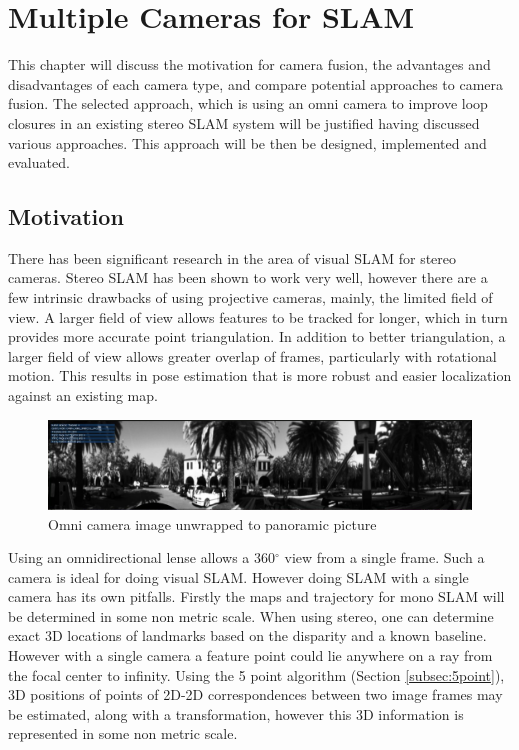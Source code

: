 \chapter{Multiple Cameras for SLAM}
\label{chapter:MultiCamSLAM}

This chapter will discuss the motivation for camera fusion, the advantages and disadvantages of each camera type, and compare potential approaches to camera fusion. The selected approach, which is using an omni camera to improve loop closures in an existing stereo SLAM system will be justified having discussed various approaches. This approach will be then be designed, implemented and evaluated.

\section{Motivation}

There has been significant research in the area of visual SLAM for stereo \\ cameras\cite{mei_09}\cite{paz_08}\cite{rslam}\cite{particle_slam}\cite{strasdat_11}.  Stereo SLAM has been shown to work very well, however there are a few intrinsic drawbacks of using projective cameras, mainly, the limited field of view.  A larger field of view allows features to be tracked for longer, which in turn provides more accurate point triangulation.  In addition to better triangulation, a larger field of view allows greater overlap of frames, particularly with rotational motion.  This results in pose estimation that is more robust and easier localization against an existing map. %

\begin{figure}[h!]
  \centering
    \includegraphics[width=1.0\textwidth]{chapters/images/unwrapped}
    \caption{Omni camera image unwrapped to panoramic picture}
  \label{fig:unwrapped}
\end{figure}

Using an omnidirectional lense allows a 360$^{\circ}$ view from a single frame.  Such a camera is ideal for doing visual SLAM.  However doing SLAM with a single camera has its own pitfalls.  Firstly the maps and trajectory for mono SLAM will be determined in some non metric scale.  When using stereo, one can determine exact 3D locations of landmarks based on the disparity and a known baseline.  However with a single camera a feature point could lie anywhere on a ray from the focal center to infinity.  Using the 5 point algorithm (Section \ref{subsec:5point}), 3D positions of points of 2D-2D correspondences between two image frames may be estimated, along with a transformation, however this 3D information is represented in some non metric scale.

